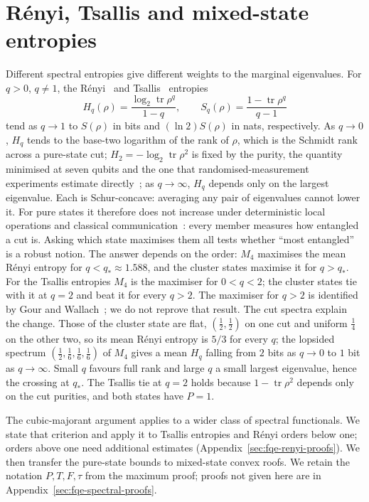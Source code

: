 \section{R\'enyi, Tsallis and mixed-state entropies}\label{sec:fqe-spectral}

Different spectral entropies give different weights to the marginal eigenvalues. For $q>0$, $q\ne1$, the R\'enyi~\cite{Renyi} and Tsallis~\cite{Tsallis} entropies
\[
 H_q(\rho)=\frac{\log_2\operatorname{tr}\rho^q}{1-q},\qquad
 S_q(\rho)=\frac{1-\operatorname{tr}\rho^q}{q-1}
\]
tend as $q\to1$ to $S(\rho)$ in bits and $(\ln2)S(\rho)$ in nats,
respectively. As $q\to0$, $H_q$ tends to the base-two logarithm of the rank of $\rho$, which is the Schmidt rank across a pure-state cut; $H_2=-\log_2\operatorname{tr}\rho^2$ is fixed by the
purity, the quantity minimised at seven qubits and the one that randomised-measurement experiments estimate
directly~\cite{Brydges19}; as $q\to\infty$, $H_q$ depends only on the largest eigenvalue. Each is Schur-concave: averaging any pair of eigenvalues cannot lower it. For
pure states it therefore does not increase under deterministic local operations and classical communication~\cite{Nielsen99}:
every member measures how entangled a cut is. Asking which state maximises them all tests whether ``most entangled''
is a robust notion. The answer depends on the order: $M_4$ maximises the mean R\'enyi entropy for $q<q_*\approx1.588$, and the cluster states maximise it for $q>q_*$. For the Tsallis entropies $M_4$ is the maximiser for $0<q<2$; the cluster states tie with it at $q=2$ and beat it for every $q>2$. The
maximiser for $q>2$ is identified by Gour and Wallach~\cite[Theorem~9(a)]{GW}; we do not reprove that result. The cut spectra explain the change. Those of the cluster state are
flat, $(\tfrac12,\tfrac12)$ on one cut and uniform $\tfrac14$ on the other two, so its mean R\'enyi entropy is $5/3$ for
every $q$; the lopsided spectrum $(\tfrac12,\tfrac16,\tfrac16,\tfrac16)$ of $M_4$ gives a mean $H_q$ falling from
$2$ bits as $q\to0$ to $1$ bit as $q\to\infty$. Small $q$ favours full rank and large $q$ a small largest
eigenvalue, hence the crossing at $q_*$. The Tsallis tie at $q=2$ holds because $1-\operatorname{tr}\rho^2$ depends
only on the cut purities, and both states have $P=1$.

The cubic-majorant argument applies to a wider class of spectral functionals. We state that criterion and
apply it to Tsallis entropies and R\'enyi orders below one; orders above one need additional estimates
(Appendix~\ref{sec:fqe-renyi-proofs}). We then transfer the pure-state bounds to mixed-state convex roofs. We retain
the notation \(P,T,F,\tau\) from the maximum proof; proofs not given here are in Appendix~\ref{sec:fqe-spectral-proofs}.

